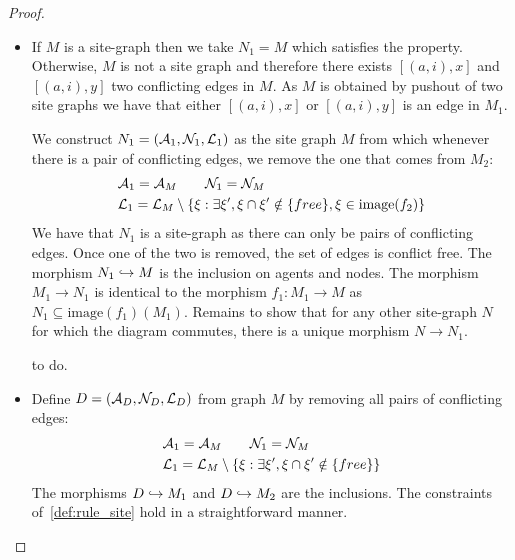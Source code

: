 \begin{proof}
  \begin{itemize}
  \item If $M$ is a site-graph then we take $N_1=M$ which satisfies the property. Otherwise, $M$ is not a site graph and therefore there exists $[(a,i),x]$ and $[(a,i),y]$ two conflicting edges in $M$. As $M$ is obtained by pushout of two site graphs we have that either $[(a,i),x]$ or $[(a,i),y]$ is an edge in $M_1$.

    We construct $N_1 = (\mathcal{A}_1,\mathcal{N}_1,\mathcal{L}_1)$ as the site graph $M$ from which whenever there is a pair of conflicting edges, we remove the one that comes from $M_2$:
    \begin{align*}
      &\mathcal{A}_1 = \mathcal{A}_M\qquad
      \mathcal{N}_1 = \mathcal{N}_M\\
      &\mathcal{L}_1 = \mathcal{L}_M\setminus \{ \xi: \exists\xi', \xi\cap \xi'\notin\{free\}, \xi\in\text{image}(f_2) \}
    \end{align*}
    We have that $N_1$ is a site-graph as there can only be pairs of conflicting edges. Once one of the two is removed, the set of edges is conflict free. The morphism $N_1\hookrightarrow M$ is the inclusion on agents and nodes. The morphism $M_1\to N_1$ is identical to the morphism $f_1:M_1\to M$ as $N_1\subseteq\text{image}(f_1)(M_1)$. Remains to show that for any other site-graph $N$ for which the diagram commutes, there is a unique morphism $N\to N_1$.
    \begin{mdframed}[backgroundcolor=blue!20]
      to do.
    \end{mdframed}
  \item Define $D=(\mathcal{A}_D,\mathcal{N}_D,\mathcal{L}_D)$ from graph $M$ by removing all pairs of conflicting edges:
    \begin{align*}
      &\mathcal{A}_1 = \mathcal{A}_M\qquad
      \mathcal{N}_1 = \mathcal{N}_M\\
      &\mathcal{L}_1 = \mathcal{L}_M\setminus \{ \xi: \exists\xi', \xi\cap \xi'\notin\{free\} \}
    \end{align*}
    The morphisms $D\hookrightarrow M_1$ and $D\hookrightarrow M_2$ are the inclusions. The constraints of~\autoref{def:rule_site} hold in a straightforward manner.
  \end{itemize}
\end{proof}
